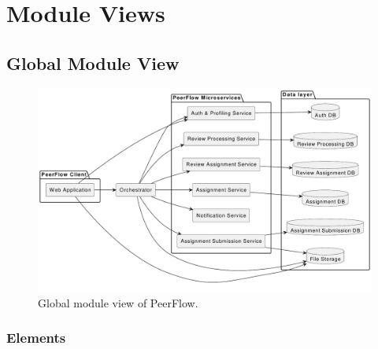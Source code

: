 \chapter{Module Views}

\section{Global Module View}

\begin{figure}[h]
    \centering
    \includegraphics[width=0.9\linewidth]{Architettura/imgs/globalmoduleview.pdf}
    \caption{Global module view of PeerFlow.}
    \label{fig:moduleViewGlobal}
\end{figure}


\subsection{Elements}

